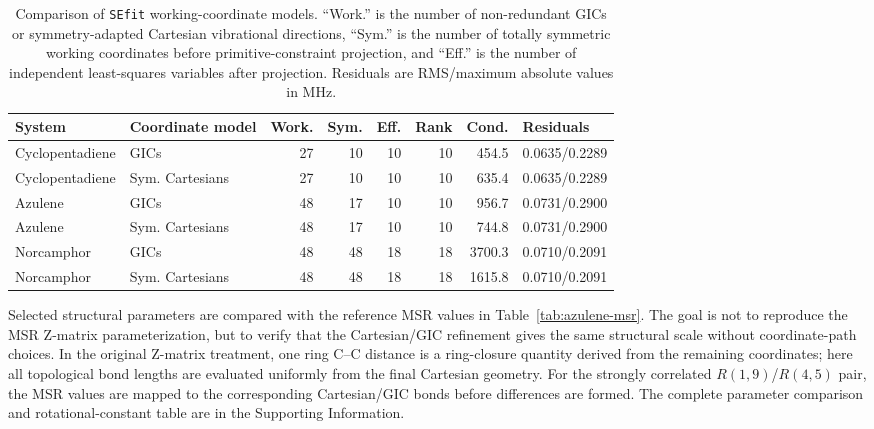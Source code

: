 \documentclass[journal=jctcce,manuscript=article,maxauthors=999]{achemso}
\begin{document}
\begin{table}
\caption{Comparison of \texttt{SEfit} working-coordinate models. ``Work.'' is
the number of non-redundant GICs or symmetry-adapted Cartesian vibrational
directions, ``Sym.'' is the number of totally symmetric working coordinates
before primitive-constraint projection, and ``Eff.'' is the number of
independent least-squares variables after projection. Residuals are
RMS/maximum absolute values in MHz.}
\label{tab:coordinate-models}
\scriptsize
\setlength{\tabcolsep}{3pt}
\begin{tabular}{@{}llrrrrrl@{}}
\toprule
System & Coordinate model & Work. & Sym. & Eff. & Rank & Cond. & Residuals \\
\midrule
Cyclopentadiene & GICs & 27 & 10 & 10 & 10 & 454.5 & 0.0635/0.2289 \\
Cyclopentadiene & Sym. Cartesians & 27 & 10 & 10 & 10 & 635.4 & 0.0635/0.2289 \\
Azulene & GICs & 48 & 17 & 10 & 10 & 956.7 & 0.0731/0.2900 \\
Azulene & Sym. Cartesians & 48 & 17 & 10 & 10 & 744.8 & 0.0731/0.2900 \\
Norcamphor & GICs & 48 & 48 & 18 & 18 & 3700.3 & 0.0710/0.2091 \\
Norcamphor & Sym. Cartesians & 48 & 48 & 18 & 18 & 1615.8 & 0.0710/0.2091 \\
\bottomrule
\end{tabular}
\end{table}

Selected structural parameters are compared with the reference MSR values in
Table~\ref{tab:azulene-msr}. The goal is not to reproduce
the MSR Z-matrix parameterization, but to verify that the Cartesian/GIC
refinement gives the same structural scale without coordinate-path choices. In
the original Z-matrix treatment, one ring C--C distance is a ring-closure
quantity derived from the remaining coordinates; here all topological bond
lengths are evaluated uniformly from the final Cartesian geometry. For the
strongly correlated $R(1,9)$/$R(4,5)$ pair, the MSR values are mapped to the
corresponding Cartesian/GIC bonds before differences are formed. The complete
parameter comparison and rotational-constant table are in the Supporting
Information.
\end{document}
